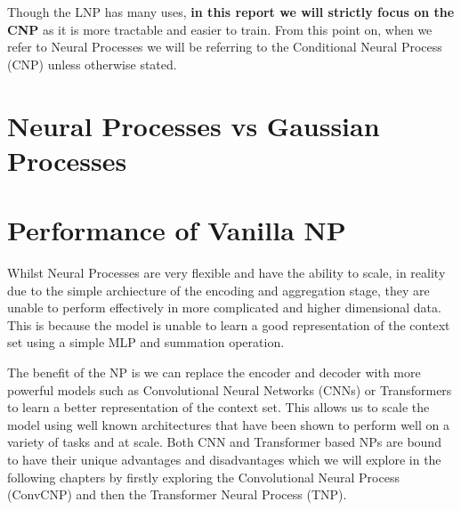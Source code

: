 \documentclass[../../main.tex]{subfiles}
\begin{document}
Though the LNP has many uses, \textbf{in this report we will strictly focus on the CNP} as it is more tractable and easier to train. From this point on, when we refer to Neural Processes we will be referring to the Conditional Neural Process (CNP) unless otherwise stated.


\section{Neural Processes vs Gaussian Processes}








\section{Performance of Vanilla NP}

Whilst Neural Processes are very flexible and have the ability to scale, in reality due to the simple archiecture of the encoding and aggregation stage, they are unable to perform effectively in more complicated and higher dimensional data. This is because the model is unable to learn a good representation of the context set using a simple MLP and summation operation. 

The benefit of the NP is we can replace the encoder and decoder with more powerful models such as Convolutional Neural Networks (CNNs) or Transformers to learn a better representation of the context set. This allows us to scale the model using well known architectures that have been shown to perform well on a variety of tasks and at scale. Both CNN and Transformer based NPs are bound to have their unique advantages and disadvantages which we will explore in the following chapters by firstly exploring the Convolutional Neural Process (ConvCNP) and then the Transformer Neural Process (TNP).

\end{document}
